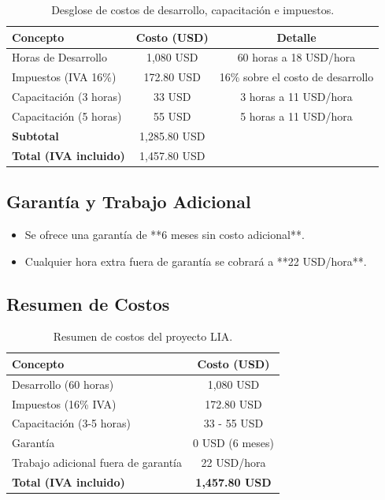 \begin{table}[H]
\centering
\begin{tabular}{|l|c|c|}
\hline
\textbf{Concepto} & \textbf{Costo (USD)} & \textbf{Detalle} \\ \hline
Horas de Desarrollo & 1,080 USD & 60 horas a 18 USD/hora \\ \hline
Impuestos (IVA 16\%) & 172.80 USD & 16\% sobre el costo de desarrollo \\ \hline
Capacitación (3 horas) & 33 USD & 3 horas a 11 USD/hora \\ \hline
Capacitación (5 horas) & 55 USD & 5 horas a 11 USD/hora \\ \hline
\textbf{Subtotal} & 1,285.80 USD & \\ \hline
\textbf{Total (IVA incluido)} & 1,457.80 USD & \\ \hline
\end{tabular}
\caption{Desglose de costos de desarrollo, capacitación e impuestos.}
\end{table}

\subsection{Garantía y Trabajo Adicional}

\begin{itemize}
    \item Se ofrece una garantía de **6 meses sin costo adicional**.
    \item Cualquier hora extra fuera de garantía se cobrará a **22 USD/hora**.
\end{itemize}

\subsection{Resumen de Costos}

\begin{table}[H]
\centering
\begin{tabular}{|l|c|}
\hline
\textbf{Concepto} & \textbf{Costo (USD)} \\ \hline
Desarrollo (60 horas) & 1,080 USD \\ \hline
Impuestos (16\% IVA) & 172.80 USD \\ \hline
Capacitación (3-5 horas) & 33 - 55 USD \\ \hline
Garantía & 0 USD (6 meses) \\ \hline
Trabajo adicional fuera de garantía & 22 USD/hora \\ \hline
\textbf{Total (IVA incluido)} & \textbf{1,457.80 USD} \\ \hline
\end{tabular}
\caption{Resumen de costos del proyecto LIA.}
\end{table}
